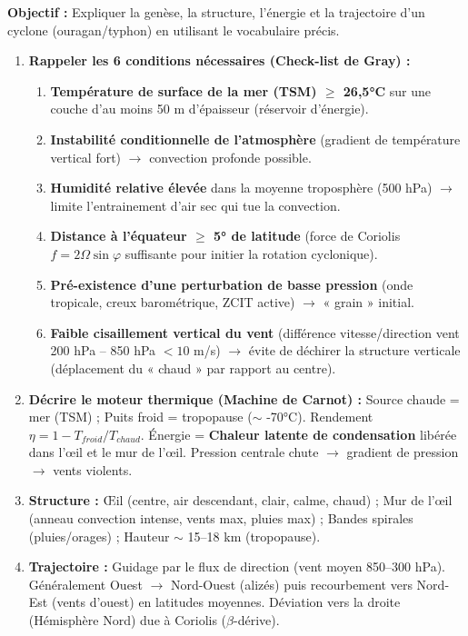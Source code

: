 \documentclass[11pt]{article}
\newcommand{\cle}[1]{{\popxbold\color{popdark}#1}}
\begin{document}
\begin{methode}
\textbf{Objectif :} Expliquer la genèse, la structure, l'énergie et la trajectoire d'un cyclone (ouragan/typhon) en utilisant le vocabulaire précis.
\begin{enumerate}
    \item \textbf{Rappeler les 6 conditions nécessaires (Check-list de Gray) :}
    \begin{enumerate}
        \item \textbf{Température de surface de la mer (TSM) $\ge$ 26,5°C} sur une couche d'au moins 50 m d'épaisseur (réservoir d'énergie).
        \item \textbf{Instabilité conditionnelle de l'atmosphère} (gradient de température vertical fort) $\to$ convection profonde possible.
        \item \textbf{Humidité relative élevée} dans la moyenne troposphère (500 hPa) $\to$ limite l'entrainement d'air sec qui tue la convection.
        \item \textbf{Distance à l'équateur $\ge$ 5° de latitude} (force de Coriolis $f = 2\Omega \sin\varphi$ suffisante pour initier la rotation cyclonique).
        \item \textbf{Pré-existence d'une perturbation de basse pression} (onde tropicale, creux barométrique, ZCIT active) $\to$ « grain » initial.
        \item \textbf{Faible cisaillement vertical du vent} (différence vitesse/direction vent 200 hPa -- 850 hPa $< 10$ m/s) $\to$ évite de déchirer la structure verticale (déplacement du « chaud » par rapport au centre).
    \end{enumerate}
    \item \textbf{Décrire le moteur thermique (Machine de Carnot) :} Source chaude = mer (TSM) ; Puits froid = tropopause ($\sim$ -70°C). Rendement $\eta = 1 - T_{froid}/T_{chaud}$. Énergie = \textbf{Chaleur latente de condensation} libérée dans l'œil et le mur de l'œil. Pression centrale chute $\to$ gradient de pression $\to$ vents violents.
    \item \textbf{Structure :} \cle{Œil} (centre, air descendant, clair, calme, chaud) ; \cle{Mur de l'œil} (anneau convection intense, vents max, pluies max) ; \cle{Bandes spirales} (pluies/orages) ; \cle{Hauteur} $\sim$ 15--18 km (tropopause).
    \item \textbf{Trajectoire :} Guidage par le flux de direction (vent moyen 850--300 hPa). Généralement Ouest $\to$ Nord-Ouest (alizés) puis recourbement vers Nord-Est (vents d'ouest) en latitudes moyennes. Déviation vers la droite (Hémisphère Nord) due à Coriolis ($\beta$-dérive).

\end{enumerate}
\end{methode}
\end{document}
